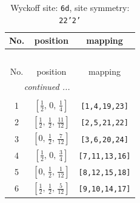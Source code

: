 \documentclass[fleqn,8pt]{jsarticle}
\begin{document}
\renewcommand{\arraystretch}{1.2}
\begin{longtable}{ccc}
\caption{Wyckoff site: {\tt 6d}, site symmetry: {\tt 22'2'}}
 \\
 \hline \hline
No. & position & mapping \\ \hline \endfirsthead

\multicolumn{2}{l}{\tablename\ \thetable{}} \\
 \hline \hline
No. & position & mapping \\ \hline \endhead

 \hline \hline
\multicolumn{2}{r}{\footnotesize\it continued ...} \\ \endfoot

 \hline \hline
\multicolumn{2}{r}{} \\ \endlastfoot

1 & $\left[ \frac{1}{2},\, 0,\, \frac{1}{4} \right]$ & {\tt [1,4,19,23]} \\ \hline
2 & $\left[ \frac{1}{2},\, \frac{1}{2},\, \frac{11}{12} \right]$ & {\tt [2,5,21,22]} \\ \hline
3 & $\left[ 0,\, \frac{1}{2},\, \frac{7}{12} \right]$ & {\tt [3,6,20,24]} \\ \hline
4 & $\left[ \frac{1}{2},\, 0,\, \frac{3}{4} \right]$ & {\tt [7,11,13,16]} \\ \hline
5 & $\left[ 0,\, \frac{1}{2},\, \frac{1}{12} \right]$ & {\tt [8,12,15,18]} \\ \hline
6 & $\left[ \frac{1}{2},\, \frac{1}{2},\, \frac{5}{12} \right]$ & {\tt [9,10,14,17]} \\
\end{longtable}
\renewcommand{\arraystretch}{1.2}
\end{document}
